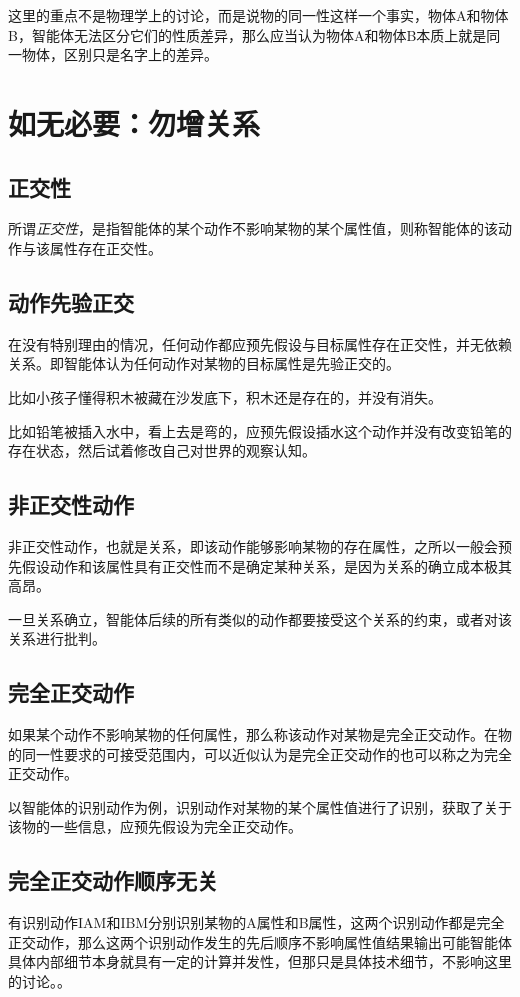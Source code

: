 \documentclass[12pt,oneside]{book}
\begin{document}
这里的重点不是物理学上的讨论，而是说物的同一性这样一个事实，物体A和物体B，智能体无法区分它们的性质差异，那么应当认为物体A和物体B本质上就是同一物体，区别只是名字上的差异。

\section{如无必要：勿增关系}
\subsection{正交性}
所谓\emph{正交性}，是指智能体的某个动作不影响某物的某个属性值，则称智能体的该动作与该属性存在正交性。


\subsection{动作先验正交}
在没有特别理由的情况，任何动作都应预先假设与目标属性存在正交性，并无依赖关系。即智能体认为任何动作对某物的目标属性是先验正交的。

比如小孩子懂得积木被藏在沙发底下，积木还是存在的，并没有消失。

比如铅笔被插入水中，看上去是弯的，应预先假设插水这个动作并没有改变铅笔的存在状态，然后试着修改自己对世界的观察认知。

\subsection{非正交性动作}
非正交性动作，也就是关系，即该动作能够影响某物的存在属性，之所以一般会预先假设动作和该属性具有正交性而不是确定某种关系，是因为关系的确立成本极其高昂。

一旦关系确立，智能体后续的所有类似的动作都要接受这个关系的约束，或者对该关系进行批判。

\subsection{完全正交动作}
如果某个动作不影响某物的任何属性，那么称该动作对某物是完全正交动作。在物的同一性要求的可接受范围内，可以近似认为是完全正交动作的也可以称之为完全正交动作。

以智能体的识别动作为例，识别动作对某物的某个属性值进行了识别，获取了关于该物的一些信息，应预先假设为完全正交动作。

\subsection{完全正交动作顺序无关}
有识别动作IAM和IBM分别识别某物的A属性和B属性，这两个识别动作都是完全正交动作，那么这两个识别动作发生的先后顺序不影响属性值结果输出{可能智能体具体内部细节本身就具有一定的计算并发性，但那只是具体技术细节，不影响这里的讨论。}。
\end{document}
